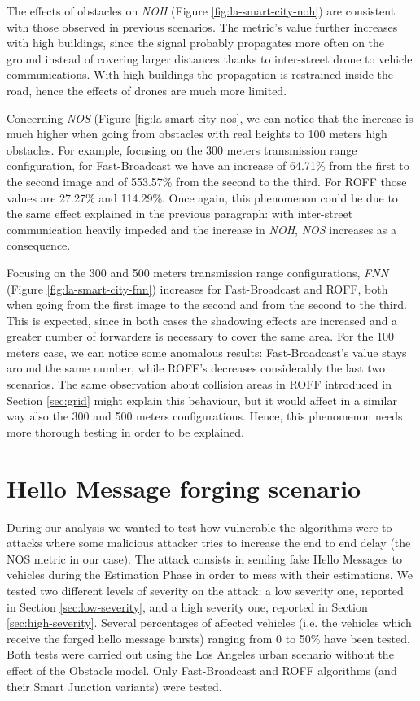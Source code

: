 	
	The effects of obstacles on \textit{NOH} (Figure \ref{fig:la-smart-city-noh}) are consistent with those observed in previous scenarios. The metric's value further increases with high buildings, since the signal probably propagates more often on the ground instead of covering larger distances thanks to inter-street drone to vehicle communications. With high buildings the propagation is restrained inside the road, hence the effects of drones are much more limited.
	
	
	Concerning \textit{NOS} (Figure \ref{fig:la-smart-city-nos}, we can notice that the increase is much higher when going from obstacles with real heights to 100 meters high obstacles. For example, focusing on the 300 meters transmission range configuration, for Fast-Broadcast we have an increase of 64.71\% from the first to the second image and of 553.57\% from the second to the third. For ROFF those values are 27.27\% and 114.29\%. Once again, this phenomenon could be due to the same effect explained in the previous paragraph: with inter-street communication heavily impeded and the increase in \textit{NOH}, \textit{NOS} increases as a consequence.
	
	
	Focusing on the 300 and 500 meters transmission range configurations, \textit{FNN} (Figure \ref{fig:la-smart-city-fnn}) increases for Fast-Broadcast and ROFF, both when going from the first image to the second and from the second to the third. This is expected, since in both cases the shadowing effects are increased and a greater number of forwarders is necessary to cover the same area. For the 100 meters case, we can notice some anomalous results: Fast-Broadcast's value stays around the same number, while ROFF's decreases considerably the last two scenarios. The same observation about collision areas in ROFF introduced in Section \ref{sec:grid} might explain this behaviour, but it would affect in a similar way also the 300 and 500 meters configurations. Hence, this phenomenon needs more thorough testing in order to be explained.
	

	\section{Hello Message forging scenario}
		During our analysis we wanted to test how vulnerable the algorithms were to attacks where some malicious attacker tries to increase the end to end delay (the NOS metric in our case). The attack consists in sending fake Hello Messages to vehicles during the Estimation Phase in order to mess with their estimations. We tested two different levels of severity on the attack: a low severity one, reported in Section \ref{sec:low-severity}, and a high severity one, reported in Section \ref{sec:high-severity}. Several percentages of affected vehicles (i.e. the vehicles which receive the forged hello message bursts) ranging from 0 to 50\% have been tested. Both tests were carried out using the Los Angeles urban scenario without the effect of the Obstacle model. Only Fast-Broadcast and ROFF algorithms (and their Smart Junction variants) were tested.
		
